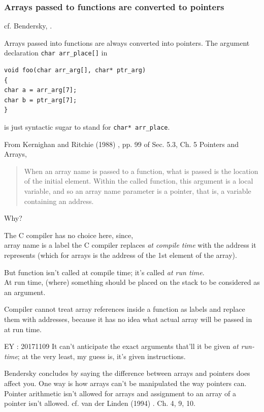 \documentclass[10pt]{amsart}
\begin{document}
\subsubsection{Arrays passed to functions are converted to pointers}  

cf. Bendersky, \cite{Bend}.  

Arrays passed into functions are always converted into pointers.  The argument declaration \verb|char arr_place[]| in  

\begin{lstlisting}
void foo(char arr_arg[], char* ptr_arg)
{
char a = arr_arg[7];
char b = ptr_arg[7];
}
\end{lstlisting} 

is just syntactic sugar to stand for \verb|char* arr_place|.  

From Kernighan and Ritchie (1988) \cite{KeRi1988}, pp. 99 of Sec. 5.3, Ch. 5 Pointers and Arrays,  

\begin{quotation}
	When an array name is passed to a function, what is passed is the location of the initial element.  Within the called function, this argument is a local variable, and so an array name parameter is a pointer, that is, a variable containing an address.  
\end{quotation}

Why?  

The C compiler has no choice here, since, \\
array name is a label the C compiler replaces \emph{at compile time}  with the address it represents (which for arrays is the address of the 1st element of the array).  

But function isn't called at compile time; it's called \emph{at run time}.  \\
At run time, (where) something should be placed on the stack to be considered as an argument.  

Compiler cannot treat array references inside a function as labels and replace them with addresses, because it has no idea what actual array will be passed in at run time.  

EY : 20171109 It can't anticipate the exact arguments that'll it be given \emph{at run-time}; at the very least, my guess is, it's given instructions.  

Bendersky \cite{Bend} concludes by saying the difference between arrays and pointers does affect you.  One way is how arrays can't be manipulated the way pointers can.  Pointer arithmetic isn't allowed for arrays and assignment to an array of a pointer isn't allowed.  cf. van der Linden (1994) \cite{Vand1994}. Ch. 4, 9, 10.  
\end{document}
